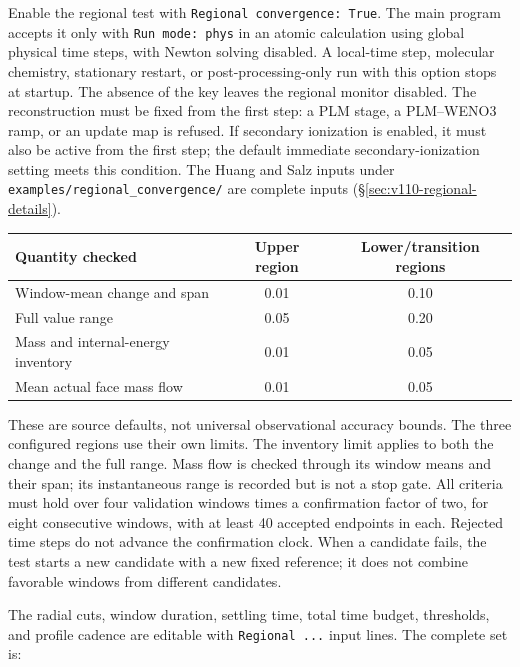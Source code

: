 Enable the regional test with \texttt{Regional convergence: True}. The main
program accepts it only with \texttt{Run mode: phys} in an atomic calculation
using global physical time steps, with Newton solving disabled. A local-time
step, molecular chemistry, stationary restart, or post-processing-only run with
this option stops at startup. The absence of the key leaves the regional
monitor disabled.
The reconstruction must be fixed from the first step: a PLM stage, a
PLM--WENO3 ramp, or an update map is refused. If secondary ionization is
enabled, it must also be active from the first step; the default immediate
secondary-ionization setting meets this condition.
The Huang and Salz inputs under
\texttt{examples/regional\_convergence/} are complete inputs
(\S\ref{sec:v110-regional-details}).

\begin{center}
\begin{tabular}{lcc}
\toprule
Quantity checked & Upper region & Lower/transition regions\\
\midrule
Window-mean change and span & 0.01 & 0.10\\
Full value range & 0.05 & 0.20\\
Mass and internal-energy inventory & 0.01 & 0.05\\
Mean actual face mass flow & 0.01 & 0.05\\
\bottomrule
\end{tabular}
\end{center}

These are source defaults, not universal observational accuracy bounds. The
three configured regions use their own limits. The inventory limit applies to
both the change and the full range. Mass flow is checked through its window
means and their span; its instantaneous range is recorded but is not a stop
gate. All criteria must hold over four validation windows times a confirmation
factor of two, for eight consecutive windows, with at least 40 accepted
endpoints in each. Rejected time steps do not advance the confirmation clock.
When a candidate fails, the test starts a new candidate with a new fixed
reference; it does not combine favorable windows from different candidates.

The radial cuts, window duration, settling time, total time budget, thresholds,
and profile cadence are editable with \texttt{Regional ...} input lines. The
complete set is:

